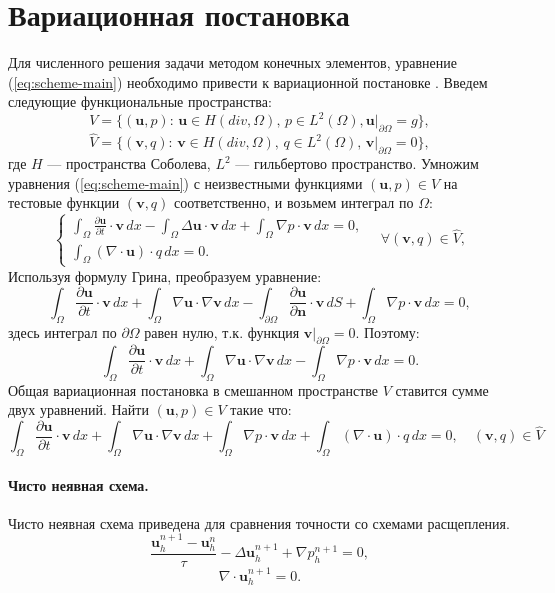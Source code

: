 \documentclass[12pt]{article}
\begin{document}
\section{Вариационная постановка}
Для численного решения задачи методом конечных элементов, уравнение (\ref{eq:scheme-main}) необходимо привести к вариационной постановке \cite{fenicsbook-2012}. Введем следующие функциональные пространства:
$$
V=\{ ({\bm u}, p) : \, {\bm u} \in H(div, \Omega), \, p \in L^2(\Omega),  {\bm u}|_{\partial \Omega}=g \},
$$
$$
\hat V=\{ ({\bm v}, q) : \, {\bm v} \in H(div, \Omega), \, q \in L^2(\Omega), \, {\bm v}|_{\partial \Omega}=0 \},
$$
где $H$ --- пространства Соболева, $L^2$ --- гильбертово пространство.
Умножим уравнения (\ref{eq:scheme-main}) с неизвестными функциями $({\bm u}, p) \in V$  на тестовые функции $({\bm v}, q)$ соответственно, и возьмем интеграл по $\Omega$:
$$
\left\{
\begin{aligned}
\int_{\Omega} \frac{\partial {\bm u}}{\partial t} \cdot {\bm v} \,dx - \int_{\Omega} \Delta {\bm u} \cdot {\bm v} \,dx + \int_{\Omega} \nabla p \cdot {\bm v} \,dx = 0, \\
\int_{\Omega} (\nabla \cdot {\bm u}) \cdot q \,dx = 0.
\end{aligned}
\right.
\quad \forall ({\bm v},q) \in \hat V,
$$
Используя формулу Грина, преобразуем уравнение:
$$
\int_{\Omega} \frac{\partial {\bm u}}{\partial t} \cdot {\bm v} \,dx + \int_{\Omega} \nabla {\bm u} \cdot \nabla {\bm v} \,dx - \int_{\partial \Omega} \frac{\partial {\bm u}}{\partial {\bm n}} \cdot {\bm v} \,dS + \int_{\Omega} \nabla p \cdot {\bm v} \,dx = 0,
$$
здесь интеграл по $\partial \Omega$ равен нулю, т.к. функция ${\bm v} | _ {\partial \Omega} = 0$. Поэтому:
$$
\int_{\Omega} \frac{\partial {\bm u}}{\partial t} \cdot {\bm v} \,dx + \int_{\Omega} \nabla {\bm u} \cdot \nabla {\bm v} \,dx - \int_{\Omega} \nabla p \cdot {\bm v} \,dx = 0.
$$
Общая вариационная постановка в смешанном пространстве $V$ ставится сумме двух уравнений. Найти $({\bm u}, p) \in V$ такие что:
$$
\int_{\Omega} \frac{\partial {\bm u}}{\partial t} \cdot {\bm v} \,dx + \int_{\Omega} \nabla {\bm u} \cdot \nabla {\bm v} \,dx + \int_{\Omega} \nabla p \cdot {\bm v} \,dx + \int_{\Omega} (\nabla \cdot {\bm u}) \cdot q \,dx = 0, \quad ({\bm v}, q) \in \hat V
$$

\paragraph{Чисто неявная схема.} Чисто неявная схема приведена для сравнения точности со схемами расщепления.
$$
\frac{{\bm u}_h^{n+1}-{\bm u}_h^n}{\tau} - \Delta {\bm u}_h^{n+1}+\nabla p_h^{n+1} = 0,
$$
$$
\nabla \cdot {\bm u}_h^{n+1} = 0.
$$
\end{document}
